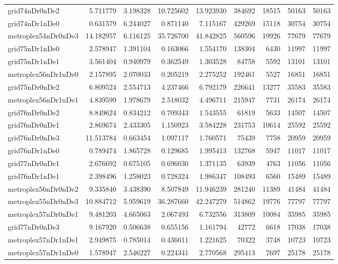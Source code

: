 \begin{longtable}{|l|r|r|r|r|r|r|r|r|}
grid74nDr0nDe2 & 5.711779 & 3.198328 & 10.725602 & 13.923930 & 384692 & 18515 & 50163 & 50163 \\
grid74nDr1nDe0 & 0.631579 & 6.244027 & 0.871140 & 7.115167 & 429269 & 15118 & 30754 & 30754 \\
metroplex54nDr0nDe3 & 14.182957 & 6.116125 & 35.726700 & 41.842825 & 560596 & 19926 & 77679 & 77679 \\
grid75nDr1nDe0 & 2.578947 & 1.391104 & 0.163066 & 1.554170 & 138304 & 6430 & 11997 & 11997 \\
grid75nDr1nDe1 & 3.561404 & 0.940979 & 0.362549 & 1.303528 & 84758 & 5592 & 13101 & 13101 \\
metroplex56nDr1nDe0 & 2.157895 & 2.070033 & 0.205219 & 2.275252 & 192461 & 5527 & 16851 & 16851 \\
grid75nDr0nDe2 & 6.809524 & 2.554713 & 4.237466 & 6.792179 & 226641 & 13277 & 35583 & 35583 \\
metroplex56nDr1nDe1 & 4.839599 & 1.978679 & 2.518032 & 4.496711 & 215947 & 7731 & 26174 & 26174 \\
grid76nDr0nDe2 & 8.849624 & 0.834212 & 0.709343 & 1.543555 & 61819 & 5633 & 14507 & 14507 \\
grid76nDr0nDe1 & 2.869674 & 2.433305 & 1.150923 & 3.584228 & 231753 & 10614 & 25592 & 25592 \\
grid76nDr0nDe3 & 11.513784 & 0.663454 & 1.097117 & 1.760571 & 75439 & 7758 & 20959 & 20959 \\
grid76nDr1nDe0 & 0.789474 & 1.865728 & 0.129685 & 1.995413 & 132768 & 5947 & 11017 & 11017 \\
grid77nDr0nDe1 & 2.676692 & 0.675105 & 0.696030 & 1.371135 & 63939 & 4763 & 11056 & 11056 \\
grid76nDr1nDe1 & 2.398496 & 1.258023 & 0.728324 & 1.986347 & 108493 & 6560 & 15489 & 15489 \\
metroplex56nDr0nDe2 & 9.335840 & 3.438390 & 8.507849 & 11.946239 & 281240 & 11389 & 41484 & 41484 \\
metroplex55nDr0nDe3 & 10.884712 & 5.959619 & 36.287660 & 42.247279 & 514862 & 19776 & 77797 & 77797 \\
metroplex57nDr0nDe1 & 9.481203 & 4.665063 & 2.067493 & 6.732556 & 313809 & 10084 & 35985 & 35985 \\
grid77nDr0nDe3 & 9.167920 & 0.506638 & 0.655156 & 1.161794 & 42772 & 6618 & 17038 & 17038 \\
metroplex57nDr1nDe1 & 2.949875 & 0.785014 & 0.436611 & 1.221625 & 70322 & 3748 & 10723 & 10723 \\
metroplex57nDr1nDe0 & 1.578947 & 2.546227 & 0.224341 & 2.770568 & 295413 & 7697 & 25178 & 25178 \\

\end{longtable}
